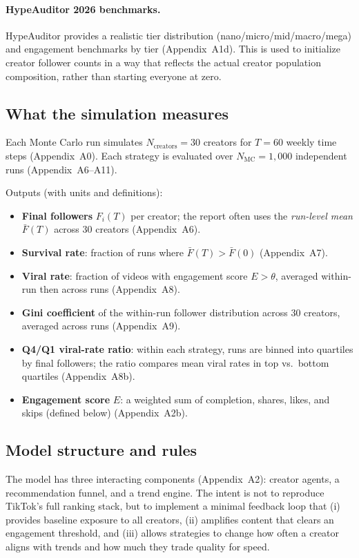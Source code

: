 \documentclass[10pt]{article}
\newcommand{\appref}[1]{(Appendix~#1)}
\begin{document}
\paragraph{HypeAuditor 2026 benchmarks.}
HypeAuditor provides a realistic tier distribution (nano/micro/mid/macro/mega) and engagement benchmarks by tier \appref{A1d}. This is used to initialize creator follower counts in a way that reflects the actual creator population composition, rather than starting everyone at zero.

\subsection{What the simulation measures}
Each Monte Carlo run simulates \(N_{\text{creators}} = 30\) creators for \(T = 60\) weekly time steps \appref{A0}. Each strategy is evaluated over \(N_{\text{MC}}=1{,}000\) independent runs \appref{A6--A11}.

Outputs (with units and definitions):
\begin{itemize}
  \item \textbf{Final followers} \(F_i(T)\) per creator; the report often uses the \emph{run-level mean} \(\bar{F}(T)\) across 30 creators \appref{A6}.
  \item \textbf{Survival rate}: fraction of runs where \(\bar{F}(T) > \bar{F}(0)\) \appref{A7}.
  \item \textbf{Viral rate}: fraction of videos with engagement score \(E > \theta\), averaged within-run then across runs \appref{A8}.
  \item \textbf{Gini coefficient} of the within-run follower distribution across 30 creators, averaged across runs \appref{A9}.
  \item \textbf{Q4/Q1 viral-rate ratio}: within each strategy, runs are binned into quartiles by final followers; the ratio compares mean viral rates in top vs.\ bottom quartiles \appref{A8b}.
  \item \textbf{Engagement score} \(E\): a weighted sum of completion, shares, likes, and skips (defined below) \appref{A2b}.
\end{itemize}

\subsection{Model structure and rules}
The model has three interacting components \appref{A2}: creator agents, a recommendation funnel, and a trend engine. The intent is not to reproduce TikTok's full ranking stack, but to implement a minimal feedback loop that (i) provides baseline exposure to all creators, (ii) amplifies content that clears an engagement threshold, and (iii) allows strategies to change how often a creator aligns with trends and how much they trade quality for speed.
\end{document}
